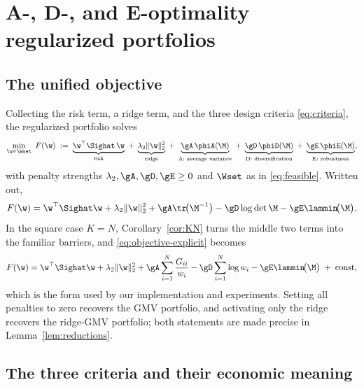 \section{A-, D-, and E-optimality regularized portfolios}
\label{sec:criteria}

\subsection{The unified objective}
Collecting the risk term, a ridge term, and the three design criteria
\eqref{eq:criteria}, the regularized portfolio solves
\begin{equation}
  \min_{\w\in\Wset}\ F(\w)
  \;:=\;
  \underbrace{\w^\top\Sighat\,\w}_{\text{risk}}
  \;+\;\underbrace{\lambda_2\lVert\w\rVert_2^2}_{\text{ridge}}
  \;+\;\underbrace{\gA\,\phiA(\M)}_{\text{A: average variance}}
  \;+\;\underbrace{\gD\,\phiD(\M)}_{\text{D: diversification}}
  \;+\;\underbrace{\gE\,\phiE(\M)}_{\text{E: robustness}} ,
  \label{eq:objective}
\end{equation}
with penalty strengths $\lambda_2,\gA,\gD,\gE\ge0$ and $\Wset$ as in
\eqref{eq:feasible}. Written out,
\begin{equation}
  F(\w)=\w^\top\Sighat\w+\lambda_2\lVert\w\rVert_2^2
  +\gA\tr\!\big(\M^{-1}\big)-\gD\log\det\M-\gE\lammin\!\big(\M\big).
  \label{eq:objective-explicit}
\end{equation}
In the square case $K=N$, Corollary~\ref{cor:KN} turns the middle two terms into
the familiar barriers, and \eqref{eq:objective-explicit} becomes
\begin{equation}
  F(\w)=\w^\top\Sighat\w+\lambda_2\lVert\w\rVert_2^2
  +\gA\sum_{i=1}^{N}\frac{G_{ii}}{w_i}
  -\gD\sum_{i=1}^{N}\log w_i
  -\gE\lammin\!\big(\M\big)
  \;+\;\text{const},
  \label{eq:objective-KN}
\end{equation}
which is the form used by our implementation and experiments. Setting all
penalties to zero recovers the GMV portfolio, and activating only the ridge
recovers the ridge-GMV portfolio; both statements are made precise in
Lemma~\ref{lem:reductions}.

\subsection{The three criteria and their economic meaning}

